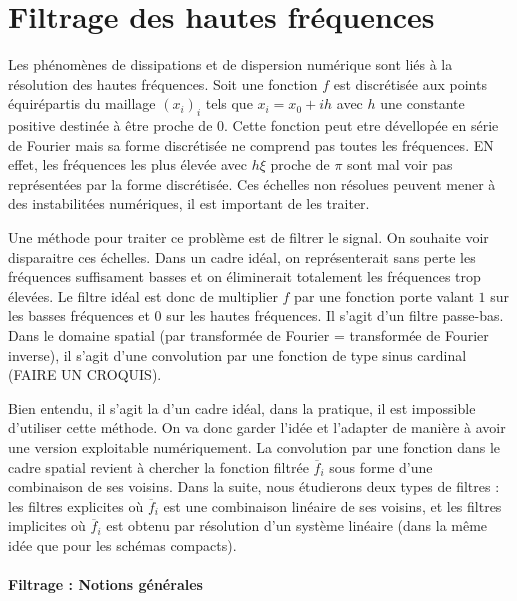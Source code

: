 \documentclass[10pt,a4paper]{amsart}
\begin{document}
%
%

\part{Filtrage des hautes fréquences}

Les phénomènes de dissipations et de dispersion numérique sont liés à la résolution des hautes fréquences. Soit une fonction $f$ est discrétisée aux points équirépartis du maillage $(x_i)_i$ tels que $x_i = x_0+ih$ avec $h$ une constante positive destinée à être proche de $0$. Cette fonction peut etre dévellopée en série de Fourier mais sa forme discrétisée ne comprend pas toutes les fréquences. EN effet, les fréquences les plus élevée avec $h \xi$ proche de $\pi$ sont mal voir pas représentées par la forme discrétisée. Ces échelles non résolues peuvent mener à des instabilitées numériques, il est important de les traiter.

Une méthode pour traiter ce problème est de filtrer le signal. On souhaite voir disparaitre ces échelles. Dans un cadre idéal, on représenterait sans perte les fréquences suffisament basses et on éliminerait totalement les fréquences trop élevées. Le filtre idéal est donc de multiplier $\widehat{f}$ par une fonction porte valant $1$ sur les basses fréquences et $0$ sur les hautes fréquences. Il s'agit d'un filtre passe-bas. Dans le domaine spatial (par transformée de Fourier = transformée de Fourier inverse), il s'agit d'une convolution par une fonction de type sinus cardinal (FAIRE UN CROQUIS).

Bien entendu, il s'agit la d'un cadre idéal, dans la pratique, il est impossible d'utiliser cette méthode. On va donc garder l'idée et l'adapter de manière à avoir une version exploitable numériquement. La convolution par une fonction dans le cadre spatial revient à chercher la fonction filtrée $\overline{f}_i$ sous forme d'une combinaison de ses voisins. Dans la suite, nous étudierons deux types de filtres : les filtres explicites où $\overline{f}_i$ est une combinaison linéaire de ses voisins, et les filtres implicites où $\overline{f}_i$ est obtenu par résolution d'un système linéaire (dans la même idée que pour les schémas compacts).

\subsection{Filtrage : Notions générales}
\end{document}
